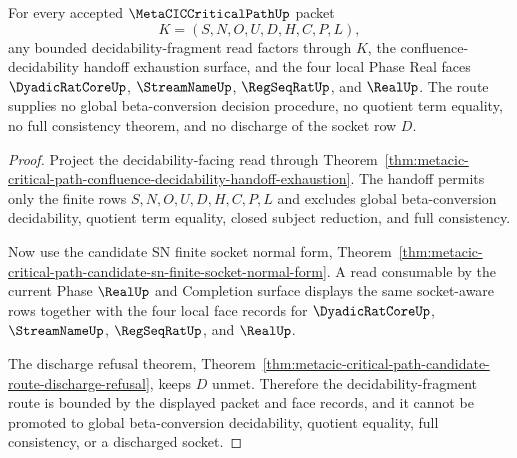 \begin{theorem}
\label{thm:metacic-critical-path-decidability-fragment-route}
For every accepted $\MetaCICCriticalPathUp$ packet
$$
K=(S,N,O,U,D,H,C,P,L),
$$
any bounded decidability-fragment read factors through $K$, the confluence-decidability handoff exhaustion surface, and the four local Phase Real faces $\DyadicRatCoreUp$, $\StreamNameUp$, $\RegSeqRatUp$, and $\RealUp$. The route supplies no global beta-conversion decision procedure, no quotient term equality, no full consistency theorem, and no discharge of the socket row $D$.
\end{theorem}
\begin{proof}
Project the decidability-facing read through Theorem~\ref{thm:metacic-critical-path-confluence-decidability-handoff-exhaustion}. The handoff permits only the finite rows $S,N,O,U,D,H,C,P,L$ and excludes global beta-conversion decidability, quotient term equality, closed subject reduction, and full consistency.

Now use the candidate SN finite socket normal form, Theorem~\ref{thm:metacic-critical-path-candidate-sn-finite-socket-normal-form}. A read consumable by the current Phase $\RealUp$ and Completion surface displays the same socket-aware rows together with the four local face records for $\DyadicRatCoreUp$, $\StreamNameUp$, $\RegSeqRatUp$, and $\RealUp$.

The discharge refusal theorem, Theorem~\ref{thm:metacic-critical-path-candidate-route-discharge-refusal}, keeps $D$ unmet. Therefore the decidability-fragment route is bounded by the displayed packet and face records, and it cannot be promoted to global beta-conversion decidability, quotient equality, full consistency, or a discharged socket.
\end{proof}

